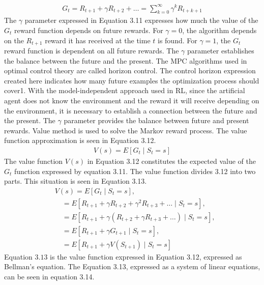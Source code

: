 \documentclass[12pt,twoside,a4]{mwbk}
\begin{document}
\begin{subequations}
\begin{align}
    G_{t}=R_{t+1}+\gamma R_{t+2}+\ldots=\sum_{k=0}^{\infty} \gamma^{k} R_{t+k+1}
\end{align}
\end{subequations}
The $\gamma$ parameter expressed in Equation 3.11 expresses how much the value of the $G_{t}$ reward function depends on future rewards. For $\gamma=0$, the algorithm depends on the $R_{t+1}$ reward it has received at the time $t$ is found. For $\gamma=1$, the $G_{t}$ reward function is dependent on all future rewards. The $\gamma$ parameter establishes the balance between the future and the present. The MPC algorithms used in optimal control theory are called horizon control. The control horizon expression created here indicates how many future examples the optimization process should cover1. With the model-independent approach used in RL, since the artificial agent does not know the environment and the reward it will receive depending on the environment, it is necessary to establish a connection between the future and the present. The $\gamma$ parameter provides the balance between future and present rewards. Value method is used to solve the Markov reward process. The value function approximation is seen in Equation 3.12.
\begin{subequations}
\begin{align}
    V(s)=E\left[G_{t} \mid S_{t}=s\right]
\end{align}
\end{subequations}
The value function $V(s)$ in Equation 3.12 constitutes the expected value of the $G_{t}$ function expressed by equation 3.11. The value function divides 3.12 into two parts. This situation is seen in Equation 3.13.
\begin{subequations}
\begin{align}
    &V(s)=E\left[G_{t} \mid S_{t}=s\right], \\
    &\quad=E\left[R_{t+1}+\gamma R_{t+2}+\gamma^{2} R_{t+3}+\ldots \mid S_{t}=s\right], \\
    &\quad=E\left[R_{t+1}+\gamma\left(R_{t+2}+\gamma R_{t+3}+\ldots\right) \mid S_{t}=s\right], \\
    &\quad=E\left[R_{t+1}+\gamma G_{t+1} \mid S_{t}=s\right], \\
    &\quad=E\left[R_{t+1}+\gamma V\left(S_{t+1}\right) \mid S_{t}=s\right]
\end{align}
\end{subequations}
Equation $3.13$ is the value function expressed in Equation 3.12, expressed as Bellman's equation. The Equation 3.13, expressed as a system of linear equations, can be seen in equation 3.14.
\end{document}
